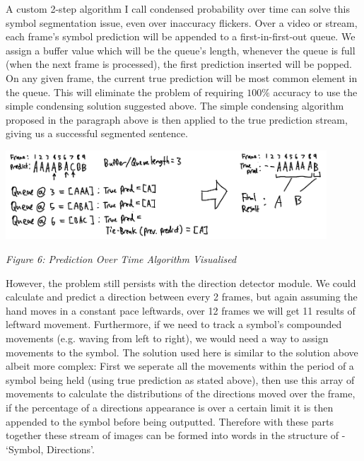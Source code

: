 \documentclass[11pt]{article}
\begin{document}
        A custom 2-step algorithm I call condensed probability over time can solve this symbol segmentation issue, even over inaccuracy flickers. Over a video or stream, each frame's symbol prediction will be appended to a first-in-first-out queue. We assign a buffer value which will be the queue's length, whenever the queue is full (when the next frame is processed), the first prediction inserted will be popped. On any given frame, the current true prediction will be most common element in the queue. This will eliminate the problem of requiring $100\%$ accuracy to use the simple condensing solution suggested above. The simple condensing algorithm proposed in the paragraph above is then applied to the true prediction stream, giving us a successful segmented sentence.

        \begin{center}
            \includegraphics[width=12cm]{images/predOverTime.png}
            \\
            \raggedright \textit{
            Figure 6: Prediction Over Time Algorithm Visualised
            }
        \end{center}

        However, the problem still persists with the direction detector module. We could calculate and predict a direction between every 2 frames, but again assuming the hand moves in a constant pace leftwards, over 12 frames we will get 11 results of leftward movement. Furthermore, if we need to track a symbol's compounded movements (e.g. waving from left to right), we would need a way to assign movements to the symbol. The solution used here is similar to the solution above albeit more complex: First we seperate all the movements within the period of a symbol being held (using true prediction as stated above), then use this array of movements to calculate the distributions of the directions moved over the frame, if the percentage of a directions appearance is over a certain limit it is then appended to the symbol before being outputted. Therefore with these parts together these stream of images can be formed into words in the structure of - `Symbol, Directions'.
\end{document}
